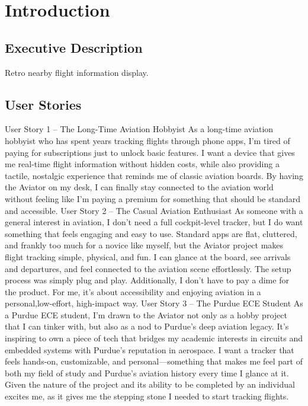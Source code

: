 \clearpage
\section{Introduction}
\subsection{Executive Description}

Retro nearby flight information display.

\subsection{User Stories}
User Story 1 – The Long-Time Aviation Hobbyist
	As a long-time aviation hobbyist who has spent years tracking flights through phone apps, I’m tired of paying for subscriptions just to unlock basic features. 
    I want a device that gives me real-time flight information without hidden costs, while also providing a tactile, nostalgic experience that reminds me of classic aviation boards. 
    By having the Aviator on my desk, I can finally stay connected to the aviation world without feeling like I’m paying a premium for something that should be standard and accessible.
User Story 2 – The Casual Aviation Enthusiast
	As someone with a general interest in aviation, I don’t need a full cockpit-level tracker, but I do want something that feels engaging and easy to use. 
    Standard apps are flat, cluttered, and frankly too much for a novice like myself, but the Aviator project makes flight tracking simple, physical, and fun. 
    I can glance at the board, see arrivals and departures, and feel connected to the aviation scene effortlessly. The setup process was simply plug and play. 
    Additionally, I don’t have to pay a dime for the product. For me, it’s about accessibility and enjoying aviation in a personal,low-effort, high-impact way.
User Story 3 – The Purdue ECE Student
	As a Purdue ECE student, I’m drawn to the Aviator not only as a hobby project that I can tinker with, but also as a nod to Purdue’s deep aviation legacy. 
    It’s inspiring to own a piece of tech that bridges my academic interests in circuits and embedded systems with Purdue’s reputation in aerospace. 
    I want a tracker that feels hands-on, customizable, and personal—something that makes me feel part of both my field of study and Purdue’s aviation history every time I glance at it. 
    Given the nature of the project and its ability to be completed by an individual excites me, as it gives me the stepping stone I needed to start tracking flights.

